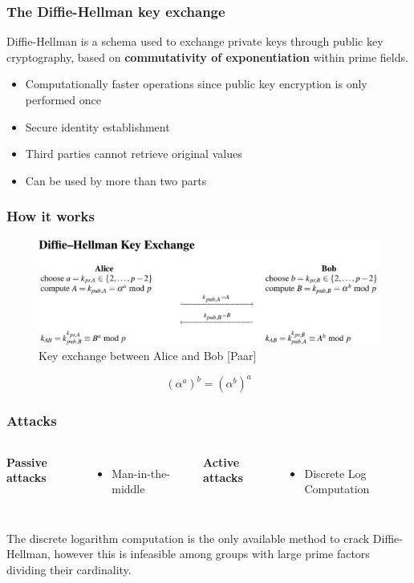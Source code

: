 \documentclass{beamer}
\begin{document}

\begin{frame}
\frametitle{The Diffie-Hellman key exchange}
Diffie-Hellman is a schema used to exchange private keys through public key cryptography, based on \textbf{commutativity of exponentiation} within prime fields.

\begin{itemize}
    \item Computationally faster operations since public key encryption is only performed once
    \item Secure identity establishment
    \item Third parties cannot retrieve original values
    \item Can be used by more than two parts
\end{itemize}


\end{frame}


\begin{frame}
\frametitle{How it works}
\begin{figure}
\includegraphics[width=1\linewidth]{DiffieHellmanPaarCropped.png}
\caption{Key exchange between Alice and Bob [Paar]}
\end{figure}
\[ (\alpha^a)^b = (\alpha^b)^a \]
\end{frame}


\begin{frame}
\frametitle{Attacks}

\begin{columns}[c] %

\textbf{Passive attacks}
\begin{itemize}
\item Man-in-the-middle
\end{itemize}

\textbf{Active attacks}
\begin{itemize}
\item Discrete Log Computation
\end{itemize}
\end{columns}
\medskip
The discrete logarithm computation is the only available method to crack Diffie-Hellman, however this is infeasible among groups with large prime factors dividing their cardinality.

\end{frame}
\end{document}
